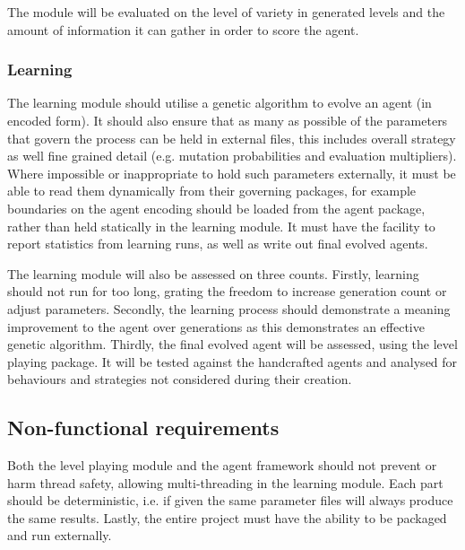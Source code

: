The module will be evaluated on the level of variety in generated levels and the amount of information it can gather in order to score the agent.

\subsubsection{Learning}
The learning module should utilise a genetic algorithm to evolve an agent (in encoded form). It should also ensure that as many as possible of the parameters that govern the process can be held in external files, this includes overall strategy as well fine grained detail (e.g. mutation probabilities and evaluation multipliers). Where impossible or inappropriate to hold such parameters externally, it must be able to read them dynamically from their governing packages, for example boundaries on the agent encoding should be loaded from the agent package, rather than held statically in the learning module. It must have the facility to report statistics from learning runs, as well as write out final evolved agents.

The learning module will also be assessed on three counts. Firstly, learning should not run for too long, grating the freedom to increase generation count or adjust parameters. Secondly, the learning process should demonstrate a meaning improvement to the agent over generations as this demonstrates an effective genetic algorithm. Thirdly, the final evolved agent will be assessed, using the level playing package. It will be tested against the handcrafted agents and analysed for behaviours and strategies not considered during their creation. 



\subsection{Non-functional requirements}

Both the level playing module and the agent framework should not prevent or harm thread safety, allowing multi-threading in the learning module. Each part should be deterministic, i.e. if given the same parameter files will always produce the same results. Lastly, the entire project must have the ability to be packaged and run externally.



